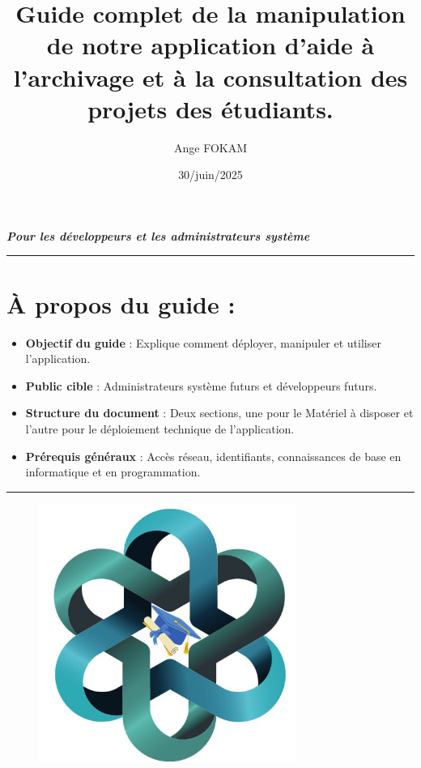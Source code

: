 \documentclass[12pt]{article}
\title{Guide complet de la manipulation de notre application d’aide à l’archivage et à la consultation des projets des étudiants.}
\author{Ange FOKAM}
\date{30/juin/2025}
\begin{document}
\maketitle
\clearpage

\tableofcontents
\newpage
\listoffigures
\clearpage

\textbf{\textit{Pour les développeurs et les administrateurs système}}

\rule{\linewidth}{0.2pt}

\section*{À propos du guide :}

\begin{itemize}[label=--]
    \item \textbf{Objectif du guide} : Explique comment déployer, manipuler et utiliser l'application.
    \item \textbf{Public cible} : Administrateurs système futurs et développeurs futurs.
    \item \textbf{Structure du document} : Deux sections, une pour le Matériel à disposer et l'autre pour le déploiement technique de l'application.
    \item \textbf{Prérequis généraux} : Accès réseau, identifiants, connaissances de base en informatique et en programmation.
\end{itemize}

\rule{\linewidth}{0.2pt}

        \begin{figure}[h] 
            \centering 
            \includegraphics[width=0.75\textwidth]{./img/logo1.jpg} 
        \end{figure}
\end{document}
